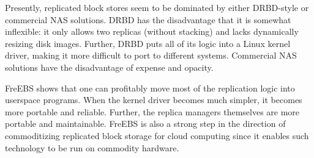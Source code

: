 Presently, replicated block stores seem to be dominated by either DRBD-style or commercial NAS solutions. DRBD has the disadvantage that it is somewhat inflexible: it only allows two replicas (without stacking) and lacks dynamically resizing disk images. Further, DRBD puts all of its logic into a Linux kernel driver, making it more difficult to port to different systems. Commercial NAS solutions have the disadvantage of expense and opacity.

FreEBS shows that one can profitably move most of the replication logic into userspace programs. When the kernel driver becomes much simpler, it becomes more portable and reliable. Further, the replica managers themselves are more portable and maintainable. FreEBS is also a strong step in the direction of commoditizing replicated block storage for cloud computing since it enables such technology to be run on commodity hardware.